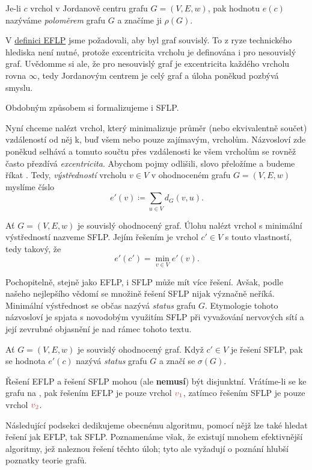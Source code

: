 \begin{definition}
\label{def:polomer-grafu}
 Je-li $c$ vrchol v Jordanově centru grafu $G = (V,E,w)$, pak hodnotu $e(c)$
 nazýváme \emph{poloměrem} grafu $G$ a značíme ji $\rho(G)$.
\end{definition}

\begin{remark}
 V \hyperref[def:eflp]{definici EFLP} jsme požadovali, aby byl graf souvislý.
 To z ryze technického hlediska není nutné, protože excentricita vrcholu je
 definována i pro nesouvislý graf. Uvědomme si ale, že pro nesouvislý graf je
 excentricita každého vrcholu rovna $\infty$, tedy Jordanovým centrem je celý
 graf a úloha poněkud pozbývá smyslu.
\end{remark}

Obdobným způsobem si formalizujeme i SFLP.

Nyní chceme nalézt vrchol, který minimalizuje průměr (nebo ekvivalent\-ně
součet) vzdáleností od něj k, buď všem nebo pouze zajímavým, vrcholům.
Názvosloví zde poněkud selhává a tomuto součtu přes vzdálenosti ke všem vrcholům
se rovněž často přezdívá \emph{excentricita}. Abychom pojmy odlišili, slovo
 přeložíme a budeme říkat . Tedy,
\emph{výstředností} vrcholu $v \in V$ v ohodnoceném grafu $G = (V,E,w)$ myslíme
číslo
\[
 e'(v) \coloneqq \sum_{u \in V} d_G(v,u).
\]

\begin{definition}
 \label{def:sflp}
 Ať $G = (V,E,w)$ je souvislý ohodnocený graf. Úlohu nalézt vrchol s minimální
 výstředností nazveme SFLP. Jejím řešením je vrchol $c' \in V$ s touto
 vlastností, tedy takový, že
 \[
  e'(c') = \min_{v \in V} e'(v).
 \]
\end{definition}

Pochopitelně, stejně jako EFLP, i SFLP může mít více řešení. Avšak, podle našeho
nejlepšího vědomí se množině řešení SFLP nijak význačně neříká. Minimální
výstřednost se občas nazývá \emph{status} grafu $G$. Etymologie tohoto
názvosloví je spjata s novodobým využitím SFLP při vyvažování nervových sítí a
její zevrubné objasnění je nad rámec tohoto textu.

\begin{definition}
 Ať $G = (V,E,w)$ je souvislý ohodnocený graf. Když $c' \in V$ je řešení SFLP,
 pak se hodnota $e'(c)$ nazývá \emph{status} grafu $G$ a značí se $\sigma(G)$.
\end{definition}

\begin{warning}
 Řešení EFLP a řešení SFLP mohou (ale \textbf{nemusí}) být disjunktní.
 Vrátíme-li se ke grafu na , pak řešením
 EFLP je pouze vrchol $\clr{v_1}$, zatímco řešením SFLP je pouze vrchol
 $\clr{v_2}$. 
\end{warning}

Následující podsekci dedikujeme obecnému algoritmu, pomocí nějž lze také hledat
řešení jak EFLP, tak SFLP. Poznamenáme však, že existují mnohem efektivnější
algoritmy, jež naleznou řešení těchto úloh; tyto ale vyžadují o poznání hlubší
poznatky teorie grafů.



